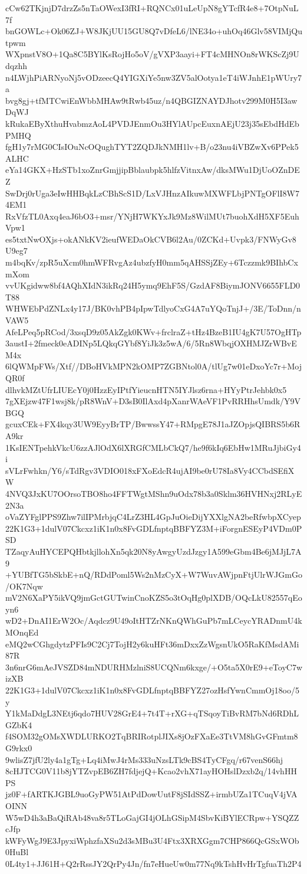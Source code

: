 cCw62TKjnjD7drzZs5nTaOWexI3fRI+RQNCx01uLeUpN8gYTcfR4e8+7OtpNuL7f
bnGOWLc+Ok06ZJ+W8JKjUU15GU8Q7vDfeL6/lNE34o+uhOq46Glv58VIMjQutpwm
WXpnstV8O+1Qa8C5BYlKsRojHo5oV/gVXP3aayi+FT4cMHNOn8rWKScZj9Udqzhh
n4LWjhPiARNyoNj5vODzeecQ4YIGXiYe5nw3ZV5alOotya1eT4iWJnhE1pWUry7a
bvg8gj+tfMTCwiEnWbbMHAw9tRwb45uz/n4QBGIZNAYDJhotv299M0H5I3awDqWJ
kRukaEByXthuHvabmzAoL4PVDJEnmOu3HYlAUpcEuxnAEjU23j35sEbdHdEbPMHQ
fgH1y7rMG0CIsIOuNcOQughTYT2ZQDJkNMH1lv+B/o23nu4iVBZwXv6PPek5ALHC
eYa14GKX+HzSTb1xoZnrGmjjipBblaubpk5hlfzVitnxAw/dksMWu1DjUoOZnDEZ
SwDrj0rUga3eIwHHBqkLzCBhScS1D/LxVJHnzAIkuwMXWFLbjPNTgOFlI8W74EM1
RxVfzTL0Axq4eaJ6bO3+msr/YNjH7WKYxJk9Mz8WilMUt7buohXdH5XF5EuhVpw1
es5txtNwOXjs+okANkKV2ieufWEDaOkCVB6l2Au/0ZCKd+Uvpk3/FNWyGv8U9eg7
m4bqKv/zpR5uXcm0hmWFRvgAz4ubzfyH0mm5qAHSSjZEy+6Tczzmk9BIhbCxmXom
vvUKgidww8bf4AQhXIdN3ikRq24H5ymq9EhF5S/GzdAF8BiymJONV6655FLD0T88
WHWEbPdZNLx4y17J/BK0vhPB4pIpwTdlyoCxG4A7uYQoTnjJ+/3E/ToDnn/nVAW5
AfeLPeq5pRCod/3xsqD9z05AkZgk0KWv+frclraZ+tHz4BzeB1IU4gK7U57OgHTp
3austI+2fmeck0eADINp5LQkqGYbf8YiJk3z5wA/6/5Rn8WbqjOXHMJZrWBvEM4x
6lQWMpFWs/Xtf//DBoHVkMPN2kOMP7ZGBNtol0A/tlUg7w01eDxoYc7r+MojQR0f
dlhvkMZtUfrLIUEcY0j0HzzEyIPtfYieucnHTN5IYJlsz6rna+HYyPtrJehbk0x5
7gXEjzw47F1wsj8k/pR8WnV+D3sB0IlAxd4pXanrWAeVF1PvRRHhsUmdk/Y9VBGQ
gcuxCEk+FX4kqy3UW9EyyBrTP/BwwssY47+RMpgE78J1aJZOpjsQIBRS5b6RA9kr
1KsIENTpehkVkcU6zzAJlOdX6lXRGfCMLbCkQ7/he9f6kIq6EbHw1MRuJjbiGy4i
sVLrFwhkn/Y6/sTdRgv3VDIO018xFXoEdcR4ujAI9be0rU78Ia8Vy4CCbdSEfiXW
4NVQ3JxKU7OOrsoTBO8ho4FFTWgtMShn9uOdx78b3a0Sklm36HVHNxj2RLyE2N3a
oVaZYFglPPS9Zhw7ilIPMrbjqC4LrZ3HL4GpJuOieDijYXXlgNA2beRfwbpXCyep
22K1G3+1dulV07Ckcxz1iK1n0x8FvGDLfnptqBBFYZ3M+iForgnESEyP4VDm0PSD
TZaqyAuHYCEPQHbtkjllohXn5qk20N8yAwgyUzdJzgy1A599eGbm4Be6jMJjL7A9
+YUBfTG5bSkbE+nQ/RDdPoml5Ws2nMzCyX+W7WuvAWjpnFtjUlrWJGmGo/OK7Nqw
mV2N6XaPY5ikVQ9jmGctGUTwinCnoKZS5o3tOqHg0plXDB/OQcLkU82557qEoyn6
wD2+DnAI1ErW2Oc/Aqdcz9U49oItHTZrNKnQWhGuPb7mLCeycYRADnmU4kMOnqEd
eMQ2wCGhgdytzPFIs9C2Cj7TojH2y6kuHFt36mDxxZzWgsnUkO5RaKfMsdAMi87R
3n6nrG6mAeJVSZD84mNDURHMzlniS8UCQNm6kxge/+O5ta5X0rE9+eToyC7wizXB
22K1G3+1dulV07Ckcxz1iK1n0x8FvGDLfnptqBBFYZ27ozHsfYwnCmmOj18oo/5y
Y1kMaDdgL3NEtj6qdo7HUV28GrE4+7t4T+rXG+qTSqoyTiBvRM7bNd6RDhLGZbK4
f4SOM32gOMsXWDLURKO2TqBRIRotplJIXs8jOzFXaEe3TtVM8hGvGFmtm8G9rkx0
9wlisZ7jfU2ly4a1gTg+Lq4iMwJ4rMs333uNzsLTk9cBS4TyCFgq/r67venS66hj
8cHJTCG0V11b8jYTZvpEB6ZH7fdjejQ+Kcao2vhX71ayHOHslDzxb2q/14vhHHPS
jz0F+fARTKJGBL9uoGyPW51AtPdDowUutF8jSIdSSZ+irmbUZa1TCuqV4jVAOINN
W5wD4h3aBaQiRAb48va8r5TLoGajGI4jOLhGSipM4SbvKiBYlECRpw+YSQZZcJfp
kWFyWgJ9E3JpyxiWphzfaXSu2d3sMBu3U4Ftx3XRXGgm7CHP866QcGSxWOb0HuBl
0L4ty1+JJ61H+Q2rRssJY2QrPy4Jn/fn7eHueUw0m77Nq9kTshHvHrTgfuaTh2P4
